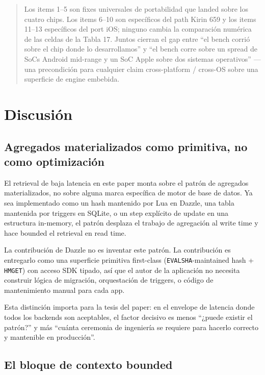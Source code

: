 \begin{quote}
Los items 1--5 son fixes universales de portabilidad que landed sobre los cuatro
chips. Los items 6--10 son específicos del path Kirin 659 y los items 11--13
específicos del port iOS; ninguno cambia la comparación numérica de las celdas
de la Tabla 17. Juntos cierran el gap entre ``el bench corrió sobre el chip
donde lo desarrollamos'' y ``el bench corre sobre un spread de SoCs Android
mid-range y un SoC Apple sobre dos sistemas operativos'' --- una precondición
para cualquier claim cross-platform / cross-OS sobre una superficie de engine
embebida.
\end{quote}

\section{Discusión}\label{discusiuxf3n}

\subsection{Agregados materializados como primitiva, no como
optimización}\label{agregados-materializados-como-primitiva-no-como-optimizaciuxf3n}

El retrieval de baja latencia en este paper monta sobre el patrón de agregados
materializados, no sobre alguna marca específica de motor de base de datos. Ya
sea implementado como un hash mantenido por Lua en Dazzle, una tabla mantenida
por triggers en SQLite, o un step explícito de update en una estructura
in-memory, el patrón desplaza el trabajo de agregación al write time y hace
bounded el retrieval en read time.

La contribución de Dazzle no es inventar este patrón. La contribución es
entregarlo como una superficie primitiva first-class
(\texttt{EVALSHA}-maintained hash + \texttt{HMGET}) con acceso SDK tipado, así
que el autor de la aplicación no necesita construir lógica de migración,
orquestación de triggers, o código de mantenimiento manual para cada app.

Esta distinción importa para la tesis del paper: en el envelope de latencia
donde todos los backends son aceptables, el factor decisivo es menos ``¿puede
existir el patrón?'' y más ``cuánta ceremonia de ingeniería se requiere para
hacerlo correcto y mantenible en producción''.

\subsection{El bloque de contexto bounded}\label{el-bloque-de-contexto-bounded}

